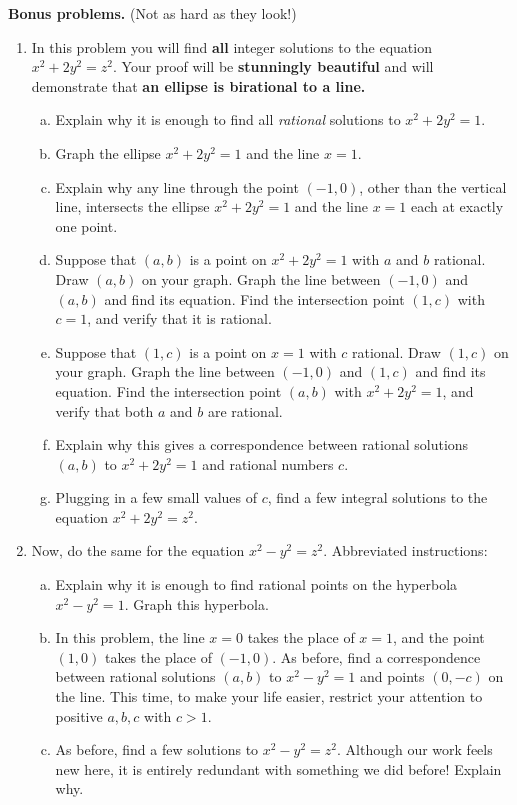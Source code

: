 \documentclass[12pt]{article}
\begin{document}
{\bf Bonus problems.} (Not as hard as they look!)
\begin{enumerate}[(1)]
\item
In this problem you will find {\bf all} integer solutions to the equation $x^2 + 2y^2 = z^2$. Your proof
will be {\bf stunningly beautiful} and will demonstrate that {\bf an ellipse is birational to
a line.}
\begin{enumerate}[(a)]
\item
Explain why it is enough to find all {\itshape rational} solutions to $x^2 + 2y^2 = 1$.
\item
Graph the ellipse $x^2 + 2y^2 = 1$ and the line $x = 1$.
\item
Explain why any line through the point $(-1, 0)$, other than the vertical line, intersects the ellipse
$x^2 + 2y^2 = 1$ and the line $x = 1$ each at exactly one point.
\item
Suppose that $(a, b)$ is a point on $x^2 + 2y^2 = 1$ with $a$ and $b$ rational. Draw $(a, b)$ on your graph.
Graph the line between $(-1, 0)$ and $(a, b)$ and find its equation. Find the intersection point $(1, c)$
with $c = 1$, and verify that it is rational.
\item
Suppose that $(1, c)$ is a point on $x = 1$ with $c$ rational. Draw $(1, c)$ on your graph.
Graph the line between $(-1, 0)$ and $(1, c)$ and find its equation. Find the intersection point $(a, b)$
with $x^2 + 2y^2 = 1$, and verify that both $a$ and $b$ are rational.
\item
Explain why this gives a correspondence between rational solutions $(a, b)$ to $x^2 + 2y^2 = 1$ and rational
numbers $c$.
\item
Plugging in a few small values of $c$, find a few integral solutions to the equation $x^2 + 2y^2 = z^2$.
\end{enumerate}

\item
Now, do the same for the equation $x^2 - y^2 = z^2$. Abbreviated instructions:
\begin{enumerate}[(a)]
\item
Explain why it is enough to find rational points on the hyperbola $x^2 - y^2 = 1$. Graph this hyperbola.
\item
In this problem, the line $x = 0$ takes the place of $x = 1$, and the point $(1, 0)$ takes the place of $(-1, 0)$.
As before, find a correspondence between rational solutions $(a, b)$ to $x^2 - y^2 = 1$ and points $(0, -c)$ on the
line. This time, to make your life easier, restrict your attention to positive $a, b, c$ with $c > 1$.
\item
As before, find a few solutions to $x^2 - y^2 = z^2$. Although our work feels new here, it is entirely redundant
with something we did before! Explain why.
\end{enumerate}

\end{enumerate}
\end{document}

